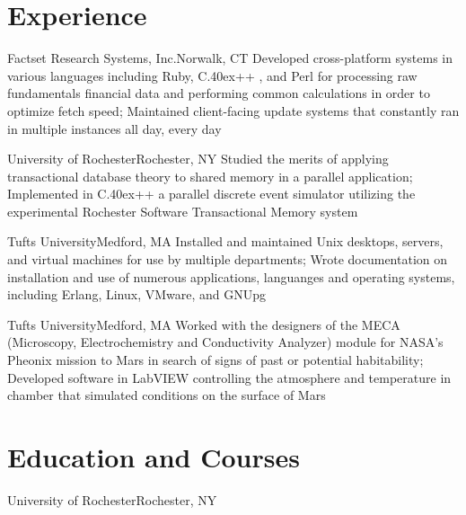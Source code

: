 \documentclass[10pt,letterpaper]{moderncv}
\def\cpp{
C\raise.40ex\hbox{\tiny{++}}
\spacefactor1000 }
\begin{document}
\maketitle

\section{Experience}
        {Factset Research Systems, Inc.}{Norwalk, CT}{}
        {Developed cross-platform systems in various languages including Ruby, \cpp, and Perl for processing raw fundamentals financial data and performing common calculations in order to optimize fetch speed; Maintained client-facing update systems that constantly ran in multiple instances all day, every day}

        {University of Rochester}{Rochester, NY}{}
        {Studied the merits of applying transactional database theory to shared memory in a parallel application; Implemented in \cpp a parallel discrete event simulator utilizing the experimental Rochester Software Transactional Memory system}

        {Tufts University}{Medford, MA}{}
        {Installed and maintained Unix desktops, servers, and virtual machines for use by multiple departments; Wrote documentation on installation and use of numerous applications, languanges and operating systems, including Erlang, Linux, VMware, and GNUpg}

        {Tufts University}{Medford, MA}{}
        {Worked with the designers of the MECA (Microscopy, Electrochemistry and Conductivity Analyzer) module for NASA's Pheonix mission to Mars in search of signs of past or potential habitability; Developed software in LabVIEW controlling the atmosphere and temperature in chamber that simulated conditions on the surface of Mars}

\section{Education and Courses}
        {University of Rochester}{Rochester, NY}{}{}
\end{document}
